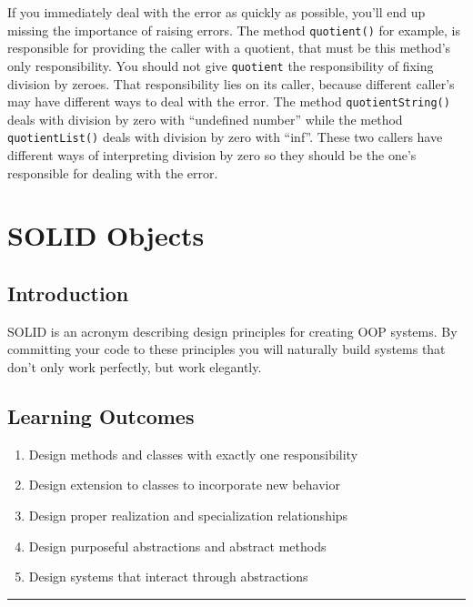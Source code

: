 If you immediately deal with the error as quickly as possible, you'll
end up missing the importance of raising errors. The method
\texttt{quotient()} for example, is responsible for providing the caller
with a quotient, that must be this method's only responsibility. You
should not give \texttt{quotient} the responsibility of fixing division
by zeroes. That responsibility lies on its caller, because different
caller's may have different ways to deal with the error. The method
\texttt{quotientString()} deals with division by zero with ``undefined
number'' while the method \texttt{quotientList()} deals with division by
zero with ``inf''. These two callers have different ways of interpreting
division by zero so they should be the one's responsible for dealing
with the error.

\chapter{SOLID Objects}\label{solid-objects.md__solid-objects}

\section{Introduction}\label{solid-objects.md__introduction}

SOLID is an acronym describing design principles for creating OOP
systems. By committing your code to these principles you will naturally
build systems that don't only work perfectly, but work elegantly.

\section{Learning Outcomes}\label{solid-objects.md__learning-outcomes}

\begin{enumerate}
\def\labelenumi{\arabic{enumi}.}
\tightlist
\item
  Design methods and classes with exactly one responsibility
\item
  Design extension to classes to incorporate new behavior
\item
  Design proper realization and specialization relationships
\item
  Design purposeful abstractions and abstract methods
\item
  Design systems that interact through abstractions
\end{enumerate}

\begin{center}\rule{0.5\linewidth}{0.5pt}\end{center}


